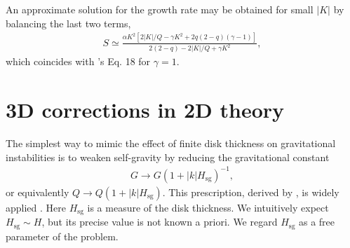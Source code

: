 An approximate solution for the growth rate may be obtained for small
$|K|$ by balancing the last two terms,
\begin{align}
  S \simeq \frac{\alpha K^2\left[2|K|/Q- \gamma K^2 + 
     2q(2-q)(\gamma-1)\right]}{2(2-q)  - 2|K|/Q + \gamma K^2 }, 
\end{align}
which coincides with \citeauthor{gammie96}'s Eq. 18 for $\gamma=1$. 




\section{3D corrections in 2D theory}\label{3dcorr}
The simplest way to mimic the effect of finite disk thickness
on gravitational instabilities is to weaken self-gravity by reducing 
the gravitational constant  
\begin{align}
  G \to G\left(1+|k|H_\mathrm{sg}\right)^{-1}, 
\end{align}
or equivalently $Q\to Q\left(1+|k|H_\mathrm{sg}\right)$. This
prescription, derived by \cite{shu84}, is widely applied
\citep[e.g.][]{youdin11,takahashi14}. Here $H_\mathrm{sg}$ is a
measure of the disk thickness. We intuitively expect
$H_\mathrm{sg}\sim H$, but its precise value is not known a priori.   
We regard $H_\mathrm{sg}$ as a free parameter of the problem.    


